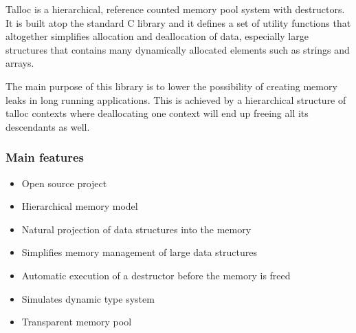 Talloc is a hierarchical, reference counted memory pool system with destructors.
It is built atop the standard C library and it defines a set of utility
functions that altogether simplifies allocation and deallocation of data,
especially large structures that contains many dynamically allocated elements
such as strings and arrays.

The main purpose of this library is to lower the possibility of creating
memory leaks in long running applications. This is achieved by a hierarchical
structure of talloc contexts where deallocating one context will end up
freeing all its descendants as well.

\subsubsection{Main features}
\begin{itemize}
  \item Open source project
  \item Hierarchical memory model
  \item Natural projection of data structures into the memory
  \item Simplifies memory management of large data structures
  \item Automatic execution of a destructor before the memory is freed
  \item Simulates dynamic type system
  \item Transparent memory pool
\end{itemize}